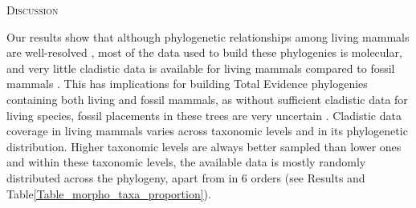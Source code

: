 \documentclass[12pt,letterpaper]{article}
\renewcommand{\section}[1]{%
\bigskip
\begin{center}
\begin{Large}
\normalfont\scshape #1
\medskip
\end{Large}
\end{center}}
\begin{document}
\section{Discussion}
Our results show that although phylogenetic relationships among living mammals are well-resolved \citep[e.g.][]{FritzTree,meredithimpacts2011,May-Collado-PeerJ} %
, most of the data used to build these phylogenies is molecular, and very little cladistic data is available for living mammals compared to fossil mammals \citep[e.g.][]{O'Leary08022013,ni2013oldest}.
This has implications for building Total Evidence phylogenies containing both living and fossil mammals, as without sufficient cladistic data for living species, fossil placements in these trees are very uncertain \citep{GuillermeCooper}.
Cladistic data coverage in living mammals varies across taxonomic levels and in its phylogenetic distribution.
Higher taxonomic levels are always better sampled than lower ones and within these taxonomic levels, the available data is mostly randomly distributed across the phylogeny, apart from in 6 orders (see Results and Table\ref{Table_morpho_taxa_proportion}).
\end{document}
